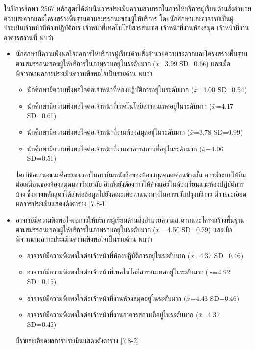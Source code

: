 ในปีการศึกษา 2567 หลักสูตรได้ดำเนินการประเมินความสามารถในการให้บริการผู้เรียนด้านสิ่งอำนวยความสะดวกและโครงสร้างพื้นฐานตามสมรรถนะของผู้ให้บริการ โดยนักศึกษาและอาจารย์เป็นผู้ประเมินเจ้าหน้าที่ห้องปฏิบัติการ เจ้าหน้าที่เทคโนโลยีสารสนเทศ เจ้าหน้าที่งานห้องสมุด เจ้าหน้าที่งานอาคารสถานที่ พบว่า
\begin{itemize}
\item นักศึกษามีความพึงพอใจต่อการให้บริการผู้เรียนด้านสิ่งอำนวยความสะดวกและโครงสร้างพื้นฐานตามสมรรถนะของผู้ให้บริการในภาพรวมอยู่ในระดับมาก ($\bar x$=3.99 SD=0.66)
และเมื่อพิจารณาผลการประเมินความพึงพอใจเป็นรายด้าน พบว่า
\begin{itemize}
	\item นักศึกษามีความพึงพอใจต่อเจ้าหน้าที่ห้องปฏิบัติการอยู่ในระดับมาก ($\bar x$=4.00 SD=0.54) 
	\item นักศึกษามีความพึงพอใจต่อเจ้าหน้าที่เทคโนโลยีสารสนเทศอยู่ในระดับมาก ($\bar x$=4.17 SD=0.61)
	\item นักศึกษามีความพึงพอใจต่อเจ้าหน้าที่งานห้องสมุดอยู่ในระดับมาก ($\bar x$=3.78 SD=0.99) 
	\item นักศึกษามีความพึงพอใจต่อเจ้าหน้าที่งานอาคารสถานที่อยู่ในระดับมาก ($\bar x$=4.06 SD=0.51)
\end{itemize}
โดยมีข้อเสนอแนะคือระยะเวลาในการยืมหนังสือของห้องสมุดคณะค่อนข้างสั้น ควรมีระบบให้ยืมต่อเหมือนของห้องสมุดมหาวิทยาลัย อีกทั้งยังต้องการให้ล้างแอร์ในห้องเรียนและห้องปฏิบัติการบ้าง ซึ่งทางหลักสูตรได้ส่งต่อข้อมูลไปยังคณะเพื่อหาแนวทางในการปรับปรุงบริการ มีรายละเอียดผลการประเมินแสดงดังตาราง \ref{7.8-1}

\item อาจารย์มีความพึงพอใจต่อการให้บริการผู้เรียนด้านสิ่งอำนวยความสะดวกและโครงสร้างพื้นฐานตามสมรรถนะของผู้ให้บริการในภาพรวมอยู่ในระดับมาก ($\bar x$ =4.50 SD=0.39)
และเมื่อพิจารณาผลการประเมินความพึงพอใจเป็นรายด้าน พบว่า
\begin{itemize}
\item อาจารย์มีความพึงพอใจต่อเจ้าหน้าที่ห้องปฏิบัติการอยู่ในระดับมาก ($\bar x$=4.37 SD=0.46)  
\item อาจารย์มีความพึงพอใจต่อเจ้าหน้าที่เทคโนโลยีสารสนเทศอยู่ในระดับมาก ($\bar x$=4.92 SD=0.16) 
\item อาจารย์มีความพึงพอใจต่อเจ้าหน้าที่งานห้องสมุดอยู่ในระดับมาก ($\bar x$=4.43 SD=0.46) 
\item อาจารย์มีความพึงพอใจต่อเจ้าหน้าที่งานอาคารสถานที่อยู่ในระดับมาก ($\bar x$=4.37 SD=0.45) 
\end{itemize}
มีรายละเอียดผลการประเมินแสดงดังตาราง \ref{7.8-2}
\end{itemize}
